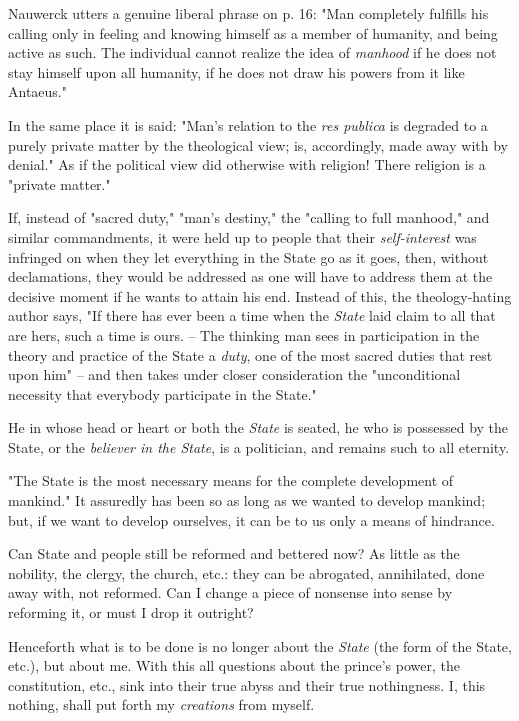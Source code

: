 Nauwerck utters a genuine liberal phrase on p. 16: "{}Man completely fulfills 
his calling only in feeling and knowing himself as a member of humanity, and 
being active as such. The individual cannot realize the idea of 
\textit{manhood} if he does not stay himself upon all humanity, if he does not 
draw his powers from it like Antaeus."{}

In the same place it is said: "{}Man's relation to the \textit{res publica} is 
degraded to a purely private matter by the theological view; is, accordingly, 
made away with by denial."{} As if the political view did otherwise with 
religion! There religion is a "{}private matter."{}

If, instead of "{}sacred duty,"{} "{}man's destiny,"{} the "{}calling to full 
manhood,"{} and similar commandments, it were held up to people that their 
\textit{self-interest} was infringed on when they let everything in the State 
go as it goes, then, without declamations, they would be addressed as one will 
have to address them at the decisive moment if he wants to attain his end. 
Instead of this, the theology-hating author says, "{}If there has ever been a 
time when the \textit{State} laid claim to all that are hers, such a time is 
ours. -- The thinking man sees in participation in the theory and practice of 
the State a \textit{duty}, one of the most sacred duties that rest upon him"{} 
-- and then takes under closer consideration the "{}unconditional necessity 
that everybody participate in the State."{}

He in whose head or heart or both the \textit{State} is seated, he who is 
possessed by the State, or the \textit{believer in the State}, is a 
politician, and remains such to all eternity.

"{}The State is the most necessary means for the complete development of 
mankind."{} It assuredly has been so as long as we wanted to develop mankind; 
but, if we want to develop ourselves, it can be to us only a means of 
hindrance.

Can State and people still be reformed and bettered now? As little as the 
nobility, the clergy, the church, etc.: they can be abrogated, annihilated, 
done away with, not reformed. Can I change a piece of nonsense into sense by 
reforming it, or must I drop it outright?

Henceforth what is to be done is no longer about the \textit{State} (the form 
of the State, etc.), but about me. With this all questions about the prince's 
power, the constitution, etc., sink into their true abyss and their true 
nothingness. I, this nothing, shall put forth my \textit{creations} from 
myself.

